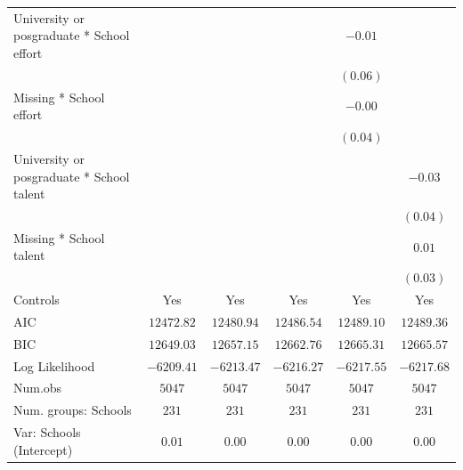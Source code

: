 \documentclass[
  12pt,
  letterpaper,
]{article}
\begin{document}
\begin{table}
{\begin{center}
{\begin{threeparttable}
\begin{tabular}{l c c c c c}
\quad University or posgraduate * School effort     &               &               &               & $-0.01$       &               \\
                                                    &               &               &               & $(0.06)$      &               \\
\quad Missing * School effort                       &               &               &               & $-0.00$       &               \\
                                                    &               &               &               & $(0.04)$      &               \\
\quad University or posgraduate * School talent     &               &               &               &               & $-0.03$       \\
                                                    &               &               &               &               & $(0.04)$      \\
\quad Missing * School talent                       &               &               &               &               & $0.01$        \\
                                                    &               &               &               &               & $(0.03)$      \\
\midrule
Controls                                            & Yes           & Yes           & Yes           & Yes           & Yes           \\
AIC                                                 & $12472.82$    & $12480.94$    & $12486.54$    & $12489.10$    & $12489.36$    \\
BIC                                                 & $12649.03$    & $12657.15$    & $12662.76$    & $12665.31$    & $12665.57$    \\
Log Likelihood                                      & $-6209.41$    & $-6213.47$    & $-6216.27$    & $-6217.55$    & $-6217.68$    \\
Num.obs                                             & $5047$        & $5047$        & $5047$        & $5047$        & $5047$        \\
Num. groups: Schools                                & $231$         & $231$         & $231$         & $231$         & $231$         \\
Var: Schools (Intercept)                            & $0.01$        & $0.00$        & $0.00$        & $0.00$        & $0.00$        \\

\end{tabular}
\end{threeparttable}}
\end{center}}
\end{table}
\end{document}

